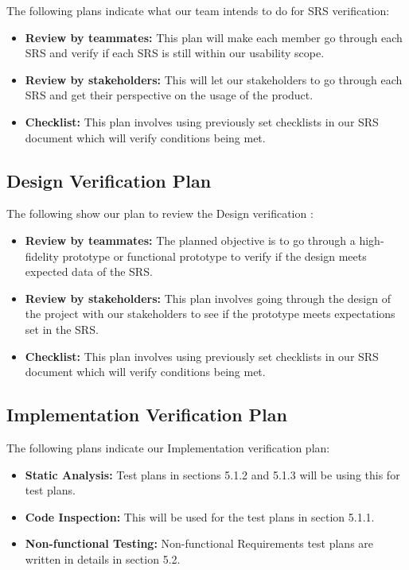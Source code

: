 \documentclass[12pt, titlepage]{article}
\begin{document}
The following plans indicate what our team intends to do for SRS verification:
\begin{itemize}
    \item \textbf{Review by teammates:} This plan will make each member go through each SRS and verify if each SRS is still within our usability scope.
    \item \textbf{Review by stakeholders:} This will let our stakeholders to go through each SRS and get their perspective on the usage of the product.
    \item \textbf{Checklist:} This plan involves using previously set checklists in our SRS document which will verify conditions being met.
\end{itemize}

\subsection{Design Verification Plan}

The following show our plan to review the Design verification :
\begin{itemize}
    \item \textbf{Review by teammates:} The planned objective is to go through a high-fidelity prototype or functional prototype to verify if the design meets expected data of the SRS.
    \item \textbf{Review by stakeholders:} This plan involves going through the design of the project with our stakeholders to see if the prototype meets expectations set in the SRS.
    \item \textbf{Checklist:} This plan involves using previously set checklists in our SRS document which will verify conditions being met. 
\end{itemize}

\subsection{Implementation Verification Plan}
The following plans indicate our Implementation verification plan:
\begin{itemize}
    \item \textbf{Static Analysis:} Test plans in sections 5.1.2 and 5.1.3 will be using this for test plans.
    \item \textbf{Code Inspection:} This will be used for the test plans in section 5.1.1.
    \item \textbf{Non-functional Testing:} Non-functional Requirements test plans are written in details in section 5.2.
\end{itemize}
\end{document}

